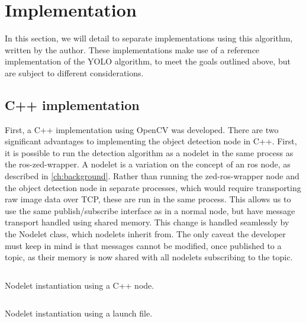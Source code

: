\documentclass[\rootfolder/main.tex]{subfiles}
\begin{document}

\section{Implementation}

In this section, we will detail to separate implementations using this algorithm, written by the author.
These implementations make use of a reference implementation of the YOLO algorithm, to meet the goals outlined above, but are subject to different considerations.


\subsection{C++ implementation}

First, a C++ implementation using OpenCV was developed.
There are two significant advantages to implementing the object detection node in C++.
First, it is possible to run the detection algorithm as a nodelet in the same process as the ros-zed-wrapper.
A nodelet is a variation on the concept of an \acrshort{ros} node, as described in \cref{ch:background}.
Rather than running the zed-ros-wrapper node and the object detection node in separate processes, which would require transporting raw image data over TCP, these are run in the same process.
This allows us to use the same publish/subscribe interface as in a normal node, but have message transport handled using shared memory.
This change is handled seamlessly by the Nodelet class, which nodelets inherit from.
The only caveat the developer must keep in mind is that messages cannot be modified, once published to a topic, as their memory is now shared with all nodelets subscribing to the topic.

\begin{listing}
    \inputminted{cpp}{\rootfolder/Chapters/Chapter5/Listings/object_detector_node.cpp}
    \caption{Nodelet instantiation using a C++ node.\label{lst:detection-node-cpp}}
\end{listing}

\begin{listing}
    \inputminted{xml}{\rootfolder/Chapters/Chapter5/Listings/ros_dnn.launch}
    \caption{Nodelet instantiation using a launch file.\label{lst:detection-node-launch}}
\end{listing}
\end{document}
